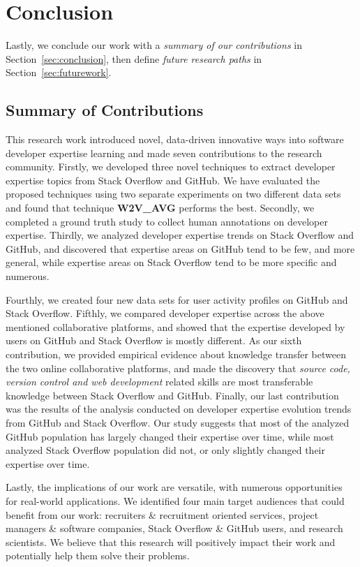 \chapter{Conclusion\label{chap:conclusion}}

    Lastly, we conclude our work with a \emph{summary of our contributions} in Section~\ref{sec:conclusion}, then define \emph{future research paths} in Section~\ref{sec:futurework}.
        
    \section{Summary of Contributions\label{sec:conclusion}}
        
        This research work introduced novel, data-driven innovative ways into software developer expertise learning and made seven contributions to the research community. Firstly, we developed three novel techniques to extract developer expertise topics from Stack Overflow and GitHub. We have evaluated the proposed techniques using two separate experiments on two different data sets and found that technique \textbf{W2V\_AVG} performs the best. Secondly, we completed a ground truth study to collect human annotations on developer expertise. Thirdly, we analyzed developer expertise trends on Stack Overflow and GitHub, and discovered that expertise areas on GitHub tend to be few, and more general, while expertise areas on Stack Overflow tend to be more specific and numerous.
        
        Fourthly, we created four new data sets for user activity profiles on GitHub and Stack Overflow. Fifthly, we compared developer expertise across the above mentioned collaborative platforms, and showed that the expertise developed by users on GitHub and Stack Overflow is mostly different. As our sixth contribution, we provided empirical evidence about knowledge transfer between the two online collaborative platforms, and made the discovery that \emph{source code, version control and web development} related skills are most transferable knowledge between Stack Overflow and GitHub. Finally, our last contribution was the results of the analysis conducted on developer expertise evolution trends from GitHub and Stack Overflow. Our study suggests that most of the analyzed GitHub population has largely changed their expertise over time, while most analyzed Stack Overflow population did not, or only slightly changed their expertise over time.
        
        Lastly, the implications of our work are versatile, with numerous opportunities for real-world applications. We identified four main target audiences that could benefit from our work: recruiters \& recruitment oriented services, project managers \& software companies, Stack Overflow \& GitHub users, and research scientists. We believe that this research will positively impact their work and potentially help them solve their problems. 
        

